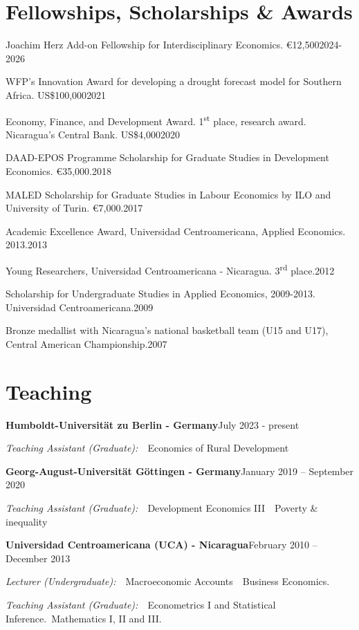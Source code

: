 \documentclass[10pt]{article}
\newcommand{\dt}[1]{\textcolor{cvgrey}{#1}}                    %
\newcommand{\eduline}[2]{\textbf{#1}\hfill\dt{#2}\par}         %
\newcommand{\rolelabel}[1]{\textit{#1}}  %
\begin{document}
\section{Fellowships, Scholarships \& Awards}
\begin{sqlist}
  \item Joachim Herz Add-on Fellowship for Interdisciplinary Economics. \euro{}12,500\hfill\dt{2024-2026}
  \item WFP's Innovation Award for developing a drought forecast model for Southern Africa. US\$100,000\hfill\dt{2021}
  \item Economy, Finance, and Development Award. 1\textsuperscript{st} place, research award. Nicaragua's Central Bank. US\$4,000\hfill\dt{2020}
  \item DAAD-EPOS Programme Scholarship for Graduate Studies in Development Economics. \euro{}35,000.\hfill\dt{2018}
  \item MALED Scholarship for Graduate Studies in Labour Economics by ILO and University of Turin. \euro{}7,000.\hfill\dt{2017}
  \item Academic Excellence Award, Universidad Centroamericana, Applied Economics. 2013.\hfill\dt{2013}
  \item Young Researchers, Universidad Centroamericana - Nicaragua. 3\textsuperscript{rd} place.\hfill\dt{2012}
  \item Scholarship for Undergraduate Studies in Applied Economics, 2009-2013. Universidad Centroamericana.\hfill\dt{2009}
  \item Bronze medallist with Nicaragua's national basketball team (U15 and U17), Central American Championship.\hfill\dt{2007}
\end{sqlist}

\section{Teaching}
\eduline{Humboldt-Universität zu Berlin - Germany}{July 2023 - present}
\begin{sqlist}
  \item \rolelabel{Teaching Assistant (Graduate):}~\textbullet~Economics of Rural Development
\end{sqlist}
\eduline{Georg-August-Universität Göttingen - Germany}{January 2019 -- September 2020}
\begin{sqlist}
  \item \rolelabel{Teaching Assistant (Graduate):}~\textbullet~Development Economics III~\textbullet~Poverty \& inequality
\end{sqlist}
\eduline{Universidad Centroamericana (UCA) - Nicaragua}{February 2010 -- December 2013}
\begin{sqlist}
  \item \rolelabel{Lecturer (Undergraduate):}~\textbullet~Macroeconomic Accounts~\textbullet~Business Economics.
  \item \rolelabel{Teaching Assistant (Graduate):}~\textbullet~Econometrics I and Statistical Inference.\textbullet~Mathematics I, II and III.
\end{sqlist}
\end{document}
